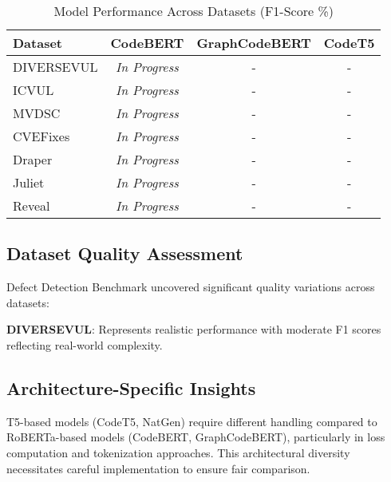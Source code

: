 \documentclass[letterpaper]{article}
\begin{document}
\begin{table}[ht]
	\centering
	\caption{Model Performance Across Datasets (F1-Score \%)}
	\label{tab:results}
	\begin{tabular}{lccc}
		\toprule
		Dataset    & CodeBERT             & GraphCodeBERT & CodeT5 \\%
		\midrule
		DIVERSEVUL & \textit{In Progress} & -             & -      \\%
		ICVUL      & \textit{In Progress} & -             & -      \\%
		MVDSC      & \textit{In Progress} & -             & -      \\%
		CVEFixes   & \textit{In Progress} & -             & -      \\%
		Draper     & \textit{In Progress} & -             & -      \\%
		Juliet     & \textit{In Progress} & -             & -      \\%
		Reveal     & \textit{In Progress} & -             & -      \\%
		\bottomrule
	\end{tabular}
\end{table}

\subsection{Dataset Quality Assessment}
Defect Detection Benchmark uncovered significant quality variations across datasets:

\textbf{DIVERSEVUL}: Represents realistic performance with moderate F1 scores reflecting real-world complexity.

\subsection{Architecture-Specific Insights}
T5-based models (CodeT5, NatGen) require different handling compared to RoBERTa-based models (CodeBERT, GraphCodeBERT), particularly in loss computation and tokenization approaches. This architectural diversity necessitates careful implementation to ensure fair comparison.
\end{document}
